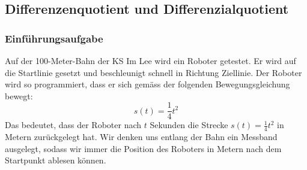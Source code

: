 \subsection{Differenzenquotient und Differenzialquotient}
\subsubsection{Einführungsaufgabe}
Auf der 100-Meter-Bahn der KS Im Lee wird ein Roboter getestet. Er wird auf die Startlinie gesetzt und beschleunigt schnell in Richtung Ziellinie. Der Roboter wird so programmiert, dass er sich gemäss der folgenden Bewegungsgleichung bewegt:
\[
    s(t) = \frac{1}{4} t^2
\]
Das bedeutet, dass der Roboter nach $t$ Sekunden die Strecke $s(t) = \frac{1}{4} t^2$ in Metern zurückgelegt hat. Wir denken uns entlang der Bahn ein Messband ausgelegt, sodass wir immer die Position des Roboters in Metern nach dem Startpunkt ablesen können.
